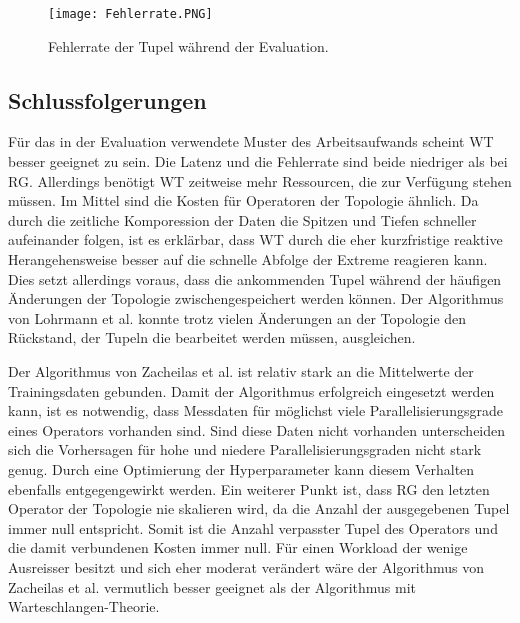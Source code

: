 \begin{figure}
\texttt{[image: Fehlerrate.PNG]}
\caption{Fehlerrate der Tupel während der Evaluation.}
\end{figure}

\subsection{Schlussfolgerungen}

Für das in der Evaluation verwendete Muster des Arbeitsaufwands scheint WT besser geeignet zu sein.
Die Latenz und die Fehlerrate sind beide niedriger als bei RG.
Allerdings benötigt WT zeitweise mehr Ressourcen, die zur Verfügung stehen müssen.
Im Mittel sind die Kosten für Operatoren der Topologie ähnlich.
Da durch die zeitliche Komporession der Daten die Spitzen und Tiefen schneller aufeinander folgen, ist es erklärbar, dass WT durch die eher kurzfristige reaktive Herangehensweise besser auf die schnelle Abfolge der Extreme reagieren kann.
Dies setzt allerdings voraus, dass die ankommenden Tupel während der häufigen Änderungen der Topologie zwischengespeichert werden können.
Der Algorithmus von Lohrmann et al. konnte trotz vielen Änderungen an der Topologie den Rückstand, der Tupeln die bearbeitet werden müssen, ausgleichen.


Der Algorithmus von Zacheilas et al. ist relativ stark an die Mittelwerte der Trainingsdaten gebunden.
Damit der Algorithmus erfolgreich eingesetzt werden kann, ist es notwendig, dass Messdaten für möglichst viele Parallelisierungsgrade eines Operators vorhanden sind.
Sind diese Daten nicht vorhanden unterscheiden sich die Vorhersagen für hohe und niedere Parallelisierungsgraden nicht stark genug.
Durch eine Optimierung der Hyperparameter kann diesem Verhalten ebenfalls entgegengewirkt werden.
Ein weiterer Punkt ist, dass RG den letzten Operator der Topologie nie skalieren wird, da die Anzahl der ausgegebenen Tupel immer null entspricht.
Somit ist die Anzahl verpasster Tupel des Operators und die damit verbundenen Kosten immer null.
Für einen Workload der wenige Ausreisser besitzt und sich eher moderat verändert wäre der Algorithmus von Zacheilas et al. vermutlich besser geeignet als der Algorithmus mit Warteschlangen-Theorie. 

